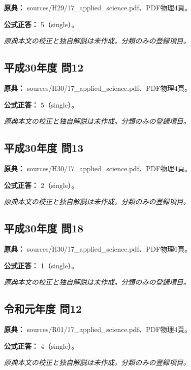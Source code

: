\noindent\textbf{原典：} sources/H29/17\_applied\_science.pdf、PDF物理4頁。

\textbf{公式正答：} 5（single）。

\par\textit{原典本文の校正と独自解説は未作成。分類のみの登録項目。}

\subsection{平成30年度 問12}
\label{q:h30-reg-applied-12}

\noindent\textbf{原典：} sources/H30/17\_applied\_science.pdf、PDF物理4頁。

\textbf{公式正答：} 5（single）。

\par\textit{原典本文の校正と独自解説は未作成。分類のみの登録項目。}

\subsection{平成30年度 問13}
\label{q:h30-reg-applied-13}

\noindent\textbf{原典：} sources/H30/17\_applied\_science.pdf、PDF物理4頁。

\textbf{公式正答：} 2（single）。

\par\textit{原典本文の校正と独自解説は未作成。分類のみの登録項目。}

\subsection{平成30年度 問18}
\label{q:h30-reg-applied-18}

\noindent\textbf{原典：} sources/H30/17\_applied\_science.pdf、PDF物理6頁。

\textbf{公式正答：} 1（single）。

\par\textit{原典本文の校正と独自解説は未作成。分類のみの登録項目。}

\subsection{令和元年度 問12}
\label{q:r01-reg-applied-12}

\noindent\textbf{原典：} sources/R01/17\_applied\_science.pdf、PDF物理4頁。

\textbf{公式正答：} 4（single）。

\par\textit{原典本文の校正と独自解説は未作成。分類のみの登録項目。}

